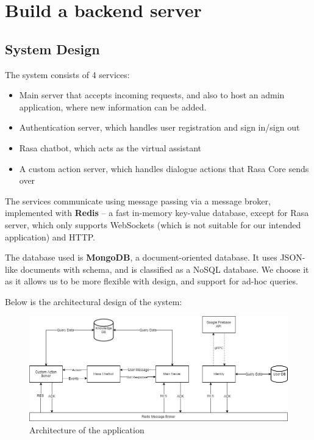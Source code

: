 
\section{Build a backend server}
\subsection{System Design}
The system consists of 4 services:
\begin{itemize}
    \item Main server that accepts incoming requests, and also to host an admin application, where new information can be added.
    \item Authentication server, which handles user registration and sign in/sign out
    \item Rasa chatbot, which acts as the virtual assistant
    \item A custom action server, which handles dialogue actions that Rasa Core sends over
\end{itemize}
The services communicate using message passing via a message broker, implemented with \textbf{Redis} -- a fast in-memory key-value database, except for Rasa server, which only supports WebSockets (which is not suitable for our intended application) and HTTP.

The database used is \textbf{MongoDB}, a document-oriented database. It uses JSON-like documents with schema, and is classified as a NoSQL database. We choose it as it allows us to be more flexible with design, and support for ad-hoc queries.

Below is the architectural design of the system:
\begin{figure}[!h]
	\centering
	\includegraphics[scale=0.4]{Picture/architecture/System.png}
	\caption{Architecture of the application}
\label{fig:arch-design}
\end{figure}

